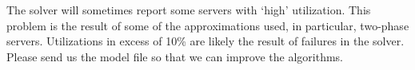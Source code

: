 The solver will sometimes report some servers with `high' utilization.
This problem is the result of some of the approximations used, in particular, two-phase servers.
Utilizations in excess of 10\% are likely the result of failures in the solver.
Please send us the model file so that we can improve the algorithms.
